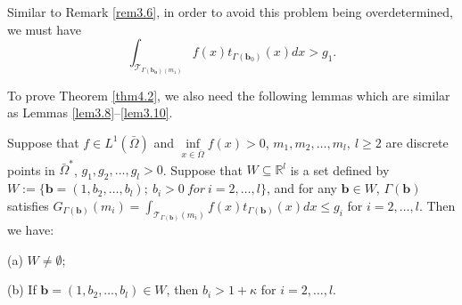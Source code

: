 \documentclass[a4paper,12pt,]{article}
\newtheorem{lemma}{\hskip\parindent\bf Lemma}[section]%
\newtheorem{remark}{\hskip\parindent\bf Remark}[section]%
\numberwithin{equation}{section}
\numberwithin{equation}{section} \allowdisplaybreaks
\begin{document}
\begin{remark}
    Similar to Remark \ref{rem3.6}, in order to avoid this problem being overdetermined, we must have
    $$\int_{\mathcal{T}_{\Gamma{(\mathbf{b_{0}})}(m_{1})}}f(x)t_{\Gamma(\mathbf{b}_{0})}(x)dx > g_{1}.$$
    \label{rem4.6}
\end{remark}

To prove Theorem \ref{thm4.2}, we also need the following lemmas which are similar as Lemmas \ref{lem3.8}--\ref{lem3.10}.

\begin{lemma}
  Suppose that $f \in L^{1}(\bar{\Omega})$ and $\inf\limits_{x \in \bar{\Omega}}f(x)>0$, $m_{1},m_{2},\ldots, m_{l},~l \geq 2$ are discrete points in $\bar{\Omega}^{\ast}$, $g_{1}, g_{2}, \ldots, g_{l}>0$. Suppose that $W \subseteq \mathbb{R}^{l}$ is a set defined by $W := \{\mathbf{b} = (1,b_{2},\ldots, b_{l});~b_{i}>0\ {for} \ i=2, \ldots, l\}$, and for any $\mathbf{b} \in W$, $\Gamma(\mathbf{b})$ satisfies $G_{\Gamma(\mathbf{b})}(m_{i}) = \displaystyle\int_{\mathcal{T}_{\Gamma(\mathbf{b})}(m_{i})}f(x)t_{\Gamma(\mathbf{b})}(x)dx \leq g_{i}$ for $i = 2,\ldots,l$. Then we have:
  
   (a) $W \neq \emptyset$;
  
   (b) If $\mathbf{b} = (1,b_{2}, \ldots, b_{l}) \in W$, then $b_{i}>1 + \kappa$ for $i=2, \ldots, l$.
  \label{lem4.8}
\end{lemma}
\end{document}
